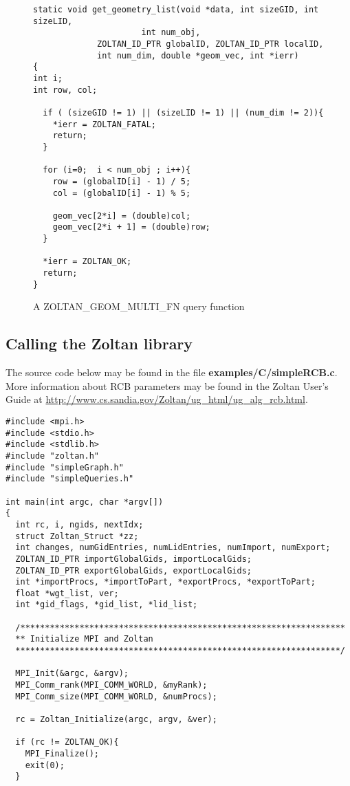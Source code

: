 \begin{figure}
\begin{flushleft}
\begin{verbatim}
static void get_geometry_list(void *data, int sizeGID, int sizeLID,
                      int num_obj,
             ZOLTAN_ID_PTR globalID, ZOLTAN_ID_PTR localID,
             int num_dim, double *geom_vec, int *ierr)
{
int i;
int row, col;
   
  if ( (sizeGID != 1) || (sizeLID != 1) || (num_dim != 2)){
    *ierr = ZOLTAN_FATAL; 
    return;
  }
    
  for (i=0;  i < num_obj ; i++){
    row = (globalID[i] - 1) / 5;
    col = (globalID[i] - 1) % 5;
  
    geom_vec[2*i] = (double)col;
    geom_vec[2*i + 1] = (double)row;
  }

  *ierr = ZOLTAN_OK;
  return;
} 
\end{verbatim}
\end{flushleft}
\caption{A ZOLTAN\_GEOM\_MULTI\_FN query function}
\label{fig:GeomMulti}
\end{figure}

\clearpage
\subsection{Calling the Zoltan library}

The source code below may be found in the file
\textbf{examples/C/simpleRCB.c}.
More information about RCB parameters
may be found in the Zoltan User's Guide at
\url{http://www.cs.sandia.gov/Zoltan/ug_html/ug_alg_rcb.html}.

\begin{flushleft}
\begin{verbatim}
#include <mpi.h>
#include <stdio.h>
#include <stdlib.h>
#include "zoltan.h"
#include "simpleGraph.h"
#include "simpleQueries.h"

int main(int argc, char *argv[])
{
  int rc, i, ngids, nextIdx;
  struct Zoltan_Struct *zz;
  int changes, numGidEntries, numLidEntries, numImport, numExport;
  ZOLTAN_ID_PTR importGlobalGids, importLocalGids;
  ZOLTAN_ID_PTR exportGlobalGids, exportLocalGids; 
  int *importProcs, *importToPart, *exportProcs, *exportToPart;
  float *wgt_list, ver;
  int *gid_flags, *gid_list, *lid_list;

  /******************************************************************
  ** Initialize MPI and Zoltan
  ******************************************************************/

  MPI_Init(&argc, &argv);
  MPI_Comm_rank(MPI_COMM_WORLD, &myRank);
  MPI_Comm_size(MPI_COMM_WORLD, &numProcs);

  rc = Zoltan_Initialize(argc, argv, &ver);

  if (rc != ZOLTAN_OK){
    MPI_Finalize();
    exit(0);
  }
\end{verbatim}
\end{flushleft}

